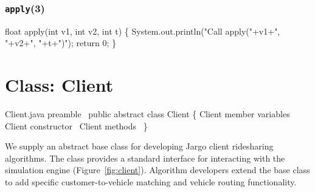\subsection{\texttt{apply}(3)}
\nwenddocs{}\endmoddef{}
float apply(int v1, int v2, int t) \{
  System.out.println("Call apply("+v1+", "+v2+", "+t+")");
  return 0;
\}
\eatline
{}\nwendcode{}\nwdocspar

\nwenddocs{}\chapter{Class: Client}
\label{client}

\nwenddocs{}\endmoddef{}
\LA{}Client.java preamble~{\nwtagstyle{}}\RA{}
public abstract class Client \{
  \LA{}\code{}Client\edoc{} member variables~{\nwtagstyle{}}\RA{}
  \LA{}\code{}Client\edoc{} constructor~{\nwtagstyle{}}\RA{}
  \LA{}\code{}Client\edoc{} methods~{\nwtagstyle{}}\RA{}
\}
\nwendcode{}\nwdocspar

We supply an abstract base class for developing Jargo client ridesharing
algorithms. The class provides a standard interface for interacting with the
simulation engine (Figure~\ref{fig:client}). Algorithm developers extend the
base class to add specific customer-to-vehicle matching and vehicle routing
functionality.

